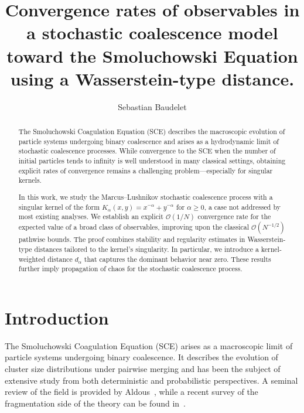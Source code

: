 \documentclass[11pt,a4paper]{article}
\title{}      %
\author{
   Sebastian Baudelet
}
\title{Convergence rates of observables in a stochastic coalescence model toward the Smoluchowski Equation using a Wasserstein-type distance.}
\date{}
\begin{document}
\maketitle


\begin{abstract}
    The Smoluchowski Coagulation Equation (SCE) describes the macroscopic evolution of particle systems undergoing binary coalescence and arises as a hydrodynamic limit of stochastic coalescence processes. While convergence to the SCE when the number of initial particles tends to infinity is well understood in many classical settings, obtaining explicit rates of convergence remains a challenging problem—especially for singular kernels.
    
    In this work, we study the Marcus–Lushnikov stochastic coalescence process with a singular kernel of the form \( K_\alpha(x, y) = x^{-\alpha} + y^{-\alpha} \) for \( \alpha \geq 0 \), a case not addressed by most existing analyses. We establish an explicit \( \mathcal{O}(1/N) \) convergence rate for the expected value of a broad class of observables, improving upon the classical \( \mathcal{O}(N^{-1/2}) \) pathwise bounds. The proof combines stability and regularity estimates in Wasserstein-type distances tailored to the kernel's singularity. In particular, we introduce a kernel-weighted distance \( d_\alpha \) that captures the dominant behavior near zero. These results further imply propagation of chaos for the stochastic coalescence process.
\end{abstract}

    

\tableofcontents

\section{Introduction}

The Smoluchowski Coagulation Equation (SCE) arises as a macroscopic limit of particle systems undergoing binary coalescence. It describes the evolution of cluster size distributions under pairwise merging and has been the subject of extensive study from both deterministic and probabilistic perspectives. A seminal review of the field is provided by Aldous~\cite{aldousDeterministicStochasticModels1999}, while a recent survey of the fragmentation side of the theory can be found in~\cite{deaconuProbabilisticRepresentationsFragmentation2023}.
\end{document}
